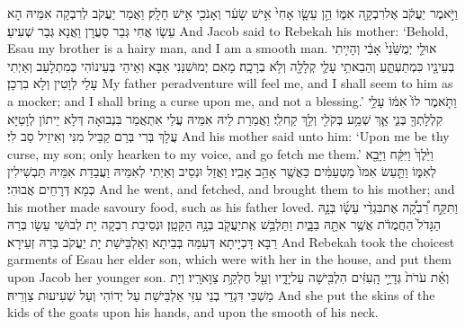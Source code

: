 {וַיֹּ֣אמֶר יַעֲקֹ֔ב אֶל\maqqaf רִבְקָ֖ה אִמּ֑וֹ הֵ֣ן עֵשָׂ֤ו אָחִי֙ אִ֣ישׁ שָׂעִ֔ר וְאָנֹכִ֖י אִ֥ישׁ חָלָֽק׃}
{וַאֲמַר יַעֲקֹב לְרִבְקָה אִמֵּיהּ הָא עֵשָׂו אֲחִי גְּבַר סַעֲרָן וַאֲנָא גְּבַר שְׁעִיעַ׃}
{And Jacob said to Rebekah his mother: ‘Behold, Esau my brother is a hairy man, and I am a smooth man.}{}
{אוּלַ֤י יְמֻשֵּׁ֙נִי֙ אָבִ֔י וְהָיִ֥יתִי בְעֵינָ֖יו כִּמְתַעְתֵּ֑עַ וְהֵבֵאתִ֥י עָלַ֛י קְלָלָ֖ה וְלֹ֥א בְרָכָֽה׃}
{מָאִם יְמוּשִׁנַּנִי אַבָּא וְאֵיהֵי בְּעֵינוֹהִי כְּמִתְלָעַב וְאַיְתִי עָלַי לְוָטִין וְלָא בִרְכָן׃}
{My father peradventure will feel me, and I shall seem to him as a mocker; and I shall bring a curse upon me, and not a blessing.’}{}
{וַתֹּ֤אמֶר לוֹ֙ אִמּ֔וֹ עָלַ֥י קִלְלָתְךָ֖ בְּנִ֑י אַ֛ךְ שְׁמַ֥ע בְּקֹלִ֖י וְלֵ֥ךְ קַֽח\maqqaf לִֽי׃}
{וַאֲמַרַת לֵיהּ אִמֵּיהּ עֲלַי אִתְאֲמַר בִּנְבוּאָה דְּלָא יֵיתוֹן לְוָטַיָּא עֲלָךְ בְּרִי בְּרַם קַבֵּיל מִנִּי וְאִיזֵיל סַב לִי׃}
{And his mother said unto him: ‘Upon me be thy curse, my son; only hearken to my voice, and go fetch me them.’}{}
{וַיֵּ֙לֶךְ֙ וַיִּקַּ֔ח וַיָּבֵ֖א לְאִמּ֑וֹ וַתַּ֤עַשׂ אִמּוֹ֙ מַטְעַמִּ֔ים כַּאֲשֶׁ֖ר אָהֵ֥ב אָבִֽיו׃}
{וַאֲזַל וּנְסֵיב וְאַיְתִי לְאִמֵּיהּ וַעֲבַדַת אִמֵּיהּ תַּבְשִׁילִין כְּמָא דְּרָחֵים אֲבוּהִי׃}
{And he went, and fetched, and brought them to his mother; and his mother made savoury food, such as his father loved.}{}
{וַתִּקַּ֣ח רִ֠בְקָ֠ה אֶת\maqqaf בִּגְדֵ֨י עֵשָׂ֜ו בְּנָ֤הּ הַגָּדֹל֙ הַחֲמֻדֹ֔ת אֲשֶׁ֥ר אִתָּ֖הּ בַּבָּ֑יִת וַתַּלְבֵּ֥שׁ אֶֽת\maqqaf יַעֲקֹ֖ב בְּנָ֥הּ הַקָּטָֽן׃}
{וּנְסֵיבַת רִבְקָה יָת לְבוּשֵׁי עֵשָׂו בְּרַהּ רַבָּא דָּכְיָיתָא דְּעִמַּהּ בְּבֵיתָא וְאַלְבֵּישַׁת יָת יַעֲקֹב בְּרַהּ זְעֵירָא׃}
{And Rebekah took the choicest garments of Esau her elder son, which were with her in the house, and put them upon Jacob her younger son.}{}
{וְאֵ֗ת עֹרֹת֙ גְּדָיֵ֣י הָֽעִזִּ֔ים הִלְבִּ֖ישָׁה עַל\maqqaf יָדָ֑יו וְעַ֖ל חֶלְקַ֥ת צַוָּארָֽיו׃}
{וְיָת מַשְׁכֵּי דִּגְדֵי בְנֵי עִזֵּי אַלְבֵּישַׁת עַל יְדוֹהִי וְעַל שְׁעִיעוּת צַוְרֵיהּ׃}
{And she put the skins of the kids of the goats upon his hands, and upon the smooth of his neck.}{}
